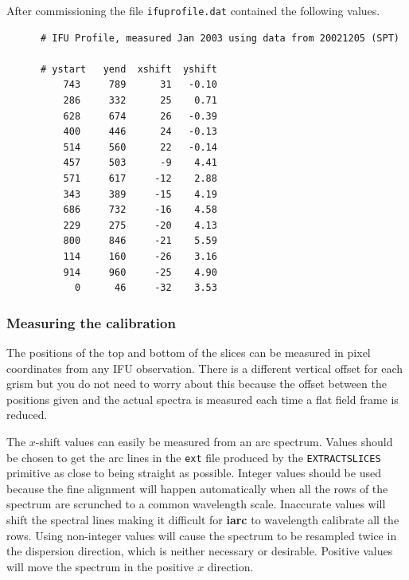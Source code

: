 \documentclass[twoside,11pt]{article}
\newcommand{\xref}[3]{#1}
\renewcommand{\_}{\texttt{\symbol{95}}}
\begin{document}
After commissioning the file {\tt ifu\_profile.dat} contained the
following values.

\begin{verbatim}
      # IFU Profile, measured Jan 2003 using data from 20021205 (SPT)

      # ystart   yend  xshift  yshift
          743     789      31   -0.10
          286     332      25    0.71
          628     674      26   -0.39
          400     446      24   -0.13
          514     560      22   -0.14
          457     503      -9    4.41
          571     617     -12    2.88
          343     389     -15    4.19
          686     732     -16    4.58
          229     275     -20    4.13
          800     846     -21    5.59
          114     160     -26    3.16
          914     960     -25    4.90
            0      46     -32    3.53
\end{verbatim}


\subsubsection{Measuring the calibration}

The positions of the top and bottom of the slices can be measured in
pixel coordinates from any IFU observation. There is a different
vertical offset for each grism but you do not need to worry about
this because the offset between the positions given and the actual
spectra is measured each time a flat field frame is reduced.

The $x$-shift values can easily be measured from an arc spectrum.
Values should be chosen to get the arc lines in the {\tt \_ext} file
produced by the {\tt \_EXTRACT\_SLICES\_} primitive as close to being
straight as possible. Integer values should be used because the fine
alignment will happen automatically when all the rows of the spectrum
are scrunched to a common wavelength scale. Inaccurate values will
shift the spectral lines making it difficult for \xref{{\bf
    iarc}}{sun86}{IARC} to wavelength calibrate all the rows.  Using
non-integer values will cause the spectrum to be resampled twice in
the dispersion direction, which is neither necessary or desirable.
Positive values will move the spectrum in the positive $x$ direction.
\end{document}

